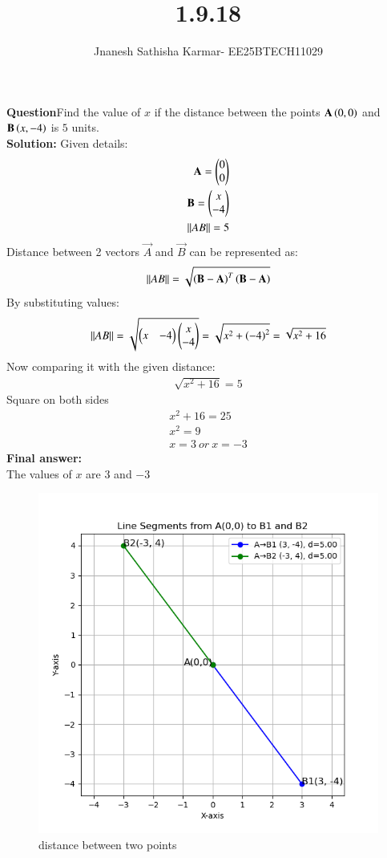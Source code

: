 \documentclass[journal]{IEEEtran}
\theoremstyle{remark}
\begin{document}

\onecolumn

\title{1.9.18}
\author{Jnanesh Sathisha Karmar- EE25BTECH11029}
\maketitle


\renewcommand{\thefigure}{\theenumi}
\renewcommand{\thetable}{\theenumi}
\textbf{Question}Find the value of $x$ if the distance between the points $\mathbf{A}\left(0, 0\right)$ and $\mathbf{B}\left(x, -4\right)$ is $5$ units.\\
\textbf{Solution: }Given details:
\begin{align}
    \mathbf{A}=\begin{pmatrix}0\\0\end{pmatrix}\\  \mathbf{B}=\begin{pmatrix}x\\-4\end{pmatrix}\\ \left\lVert AB\right\rVert=5 
\end{align}
Distance between 2 vectors $\vec{A}$ and $\vec{B}$ can be represented as:
\begin{align}
    \left\lVert AB\right\rVert=\sqrt{\left(\mathbf{B}-\mathbf{A}\right)^T\left(\mathbf{B}-\mathbf{A}\right)}
\end{align}
By substituting values:
\begin{align}
    \left\lVert AB\right\rVert=\sqrt{\begin{pmatrix}x & -4\end{pmatrix}\begin{pmatrix}x \\-4\end{pmatrix}}=\sqrt{x^2 + \left(-4\right)^2}=\sqrt{x^2+16}
\end{align}
Now comparing it with the given distance:
\begin{align}
    \sqrt{x^2+16}=5
\end{align}
Square on both sides
\begin{align}
    x^2 +16=25\\
    x^2=9\\
    x=3\  or\ x=-3 
\end{align}
\textbf{Final answer:}\\
The values of $x$ are $3$ and $-3$
\begin{figure}[H]
    \centering
    \includegraphics[width=1\columnwidth]{figs/distance.png}
    \caption{distance between two points
    }
    \label{fig:placeholder_1}
\end{figure}
\end{document}

